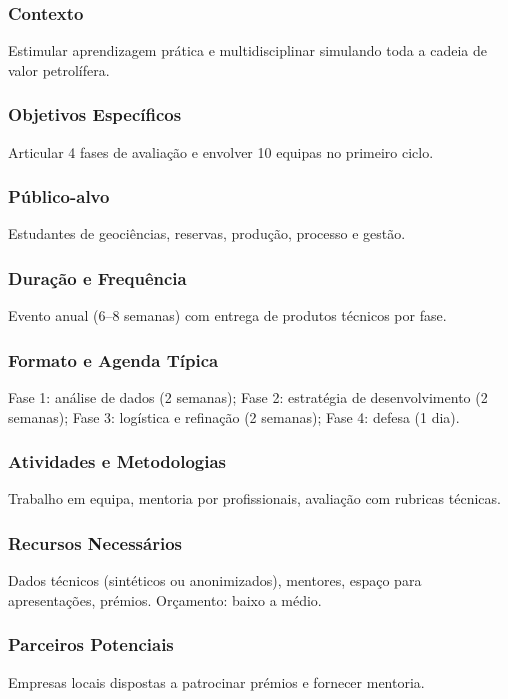 \documentclass[12pt,a4paper]{article}
\begin{document}
\subsubsection*{Contexto}
Estimular aprendizagem prática e multidisciplinar simulando toda a cadeia de valor petrolífera.

\subsubsection*{Objetivos Específicos}
Articular 4 fases de avaliação e envolver 10 equipas no primeiro ciclo.

\subsubsection*{Público-alvo}
Estudantes de geociências, reservas, produção, processo e gestão.

\subsubsection*{Duração e Frequência}
Evento anual (6–8 semanas) com entrega de produtos técnicos por fase.

\subsubsection*{Formato e Agenda Típica}
Fase 1: análise de dados (2 semanas); Fase 2: estratégia de desenvolvimento (2 semanas); Fase 3: logística e refinação (2 semanas); Fase 4: defesa (1 dia).

\subsubsection*{Atividades e Metodologias}
Trabalho em equipa, mentoria por profissionais, avaliação com rubricas técnicas.

\subsubsection*{Recursos Necessários}
Dados técnicos (sintéticos ou anonimizados), mentores, espaço para apresentações, prémios. Orçamento: baixo a médio.

\subsubsection*{Parceiros Potenciais}
Empresas locais dispostas a patrocinar prémios e fornecer mentoria.
\end{document}
